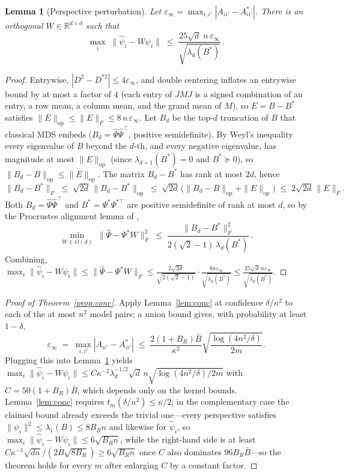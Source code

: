 \documentclass{article}
\newtheorem{lemma}{Lemma}
\theoremstyle{definition}
\theoremstyle{plain}
\begin{document}
\begin{lemma}[Perspective perturbation]
\label{lem:pert}
Let $\varepsilon_\infty=\max_{i,i'}|A_{ii'}-A^*_{ii'}|$. There is an orthogonal
$W\in\mathbb{R}^{d\times d}$ such that
\[
\max_i\;\|\hat\psi_i-W\psi_i\|\;\le\;
\frac{25\sqrt{d}\;n\,\varepsilon_\infty}{\sqrt{\lambda_d(B^*)}}\,.
\]
\end{lemma}
\begin{proof}
Entrywise, $|D^2-D^{*2}|\le4\varepsilon_\infty$, and double centering inflates an
entrywise bound by at most a factor of $4$ (each entry of $JMJ$ is a signed combination
of an entry, a row mean, a column mean, and the grand mean of $M$), so $E=B-B^*$
satisfies
$\|E\|_{\mathrm{op}}\le\|E\|_F\le8\,n\,\varepsilon_\infty$. Let $B_d$ be the top-$d$
truncation of $B$ that classical MDS embeds ($B_d=\hat\Psi\hat\Psi^\top$, positive
semidefinite). By Weyl's inequality every eigenvalue of $B$ beyond the $d$-th, and every
negative eigenvalue, has magnitude at most $\|E\|_{\mathrm{op}}$ (since
$\lambda_{d+1}(B^*)=0$ and $B^*\succeq0$), so
$\|B_d-B\|_{\mathrm{op}}\le\|E\|_{\mathrm{op}}$. The matrix $B_d-B^*$ has rank at most
$2d$, hence
\[
\|B_d-B^*\|_F\;\le\;\sqrt{2d}\,\|B_d-B^*\|_{\mathrm{op}}
\;\le\;\sqrt{2d}\,\big(\|B_d-B\|_{\mathrm{op}}+\|E\|_{\mathrm{op}}\big)
\;\le\;2\sqrt{2d}\,\|E\|_F .
\]
Both $B_d=\hat\Psi\hat\Psi^\top$ and $B^*=\Psi^*\Psi^{*\top}$ are positive semidefinite of
rank at most $d$, so by the Procrustes alignment lemma of
\citet[Lemma~5.4]{tu2016procrustes},
\[
\min_{W\in O(d)}\;\|\hat\Psi-\Psi^*W\|_F^2
\;\le\;\frac{\|B_d-B^*\|_F^2}{2(\sqrt2-1)\,\lambda_d(B^*)}\,.
\]
Combining, $\max_i\|\hat\psi_i-W\psi_i\|\le\|\hat\Psi-\Psi^*W\|_F\le
\frac{2\sqrt{2d}}{\sqrt{2(\sqrt2-1)}}\cdot\frac{8n\varepsilon_\infty}{\sqrt{\lambda_d(B^*)}}
\le\frac{25\sqrt d\,n\varepsilon_\infty}{\sqrt{\lambda_d(B^*)}}$.
\end{proof}

\begin{proof}[Proof of Theorem~\ref{prop:conc}]
Apply Lemma~\ref{lem:conc} at
confidence $\delta/n^2$ to each of the at most $n^2$ model pairs; a union bound gives,
with probability at least $1-\delta$,
\[
\varepsilon_\infty\;=\;\max_{i,i'}|A_{ii'}-A^*_{ii'}|
\;\le\;\frac{2(1+B_R)\bar B}{\kappa^{2}}\sqrt{\frac{\log(4n^{2}/\delta)}{2m}}.
\]
Plugging this into Lemma~\ref{lem:pert} yields
$\max_i\|\hat\psi_i-W\psi_i\|\le
C\kappa^{-2}\lambda_d^{-1/2}\sqrt{d}\,n\sqrt{\log(4n^{2}/\delta)/2m}$ with
$C=50(1+B_R)\bar B$, which depends only on the kernel bounds. Lemma~\ref{lem:conc}
requires $t_m(\delta/n^2)\le\kappa/2$; in the complementary case the claimed bound
already exceeds the trivial one---every perspective satisfies
$\|\psi_i\|^2\le\lambda_1(B)\le 8B_Rn$ and likewise for $\hat\psi_i$, so
$\max_i\|\hat\psi_i-W\psi_i\|\le6\sqrt{B_Rn}$, while the right-hand side is at least
$C\kappa^{-1}\sqrt{dn}/(2\bar B\sqrt{8B_R})\ge6\sqrt{B_Rn}$ once $C$ also dominates
$96B_R\bar B$---so the theorem holds for every $m$ after enlarging $C$ by a constant
factor.
\end{proof}
\end{document}
